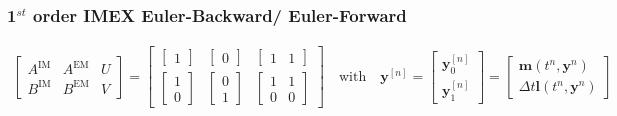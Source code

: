 \subsubsection{1$^{st}$ order IMEX Euler-Backward/ Euler-Forward}
\begin{align*}
\left[ \begin{array}{cc|c}
A^{\mathrm{IM}} & A^{\mathrm{EM}} & U \\
\hline
B^{\mathrm{IM}} & B^{\mathrm{EM}} & V
\end{array} \right ] =
\left[\begin{array}{cc|c}
\left [ \begin{array}{c} 1 \end{array} \right ] & \left [ \begin{array}{c} 0 \end{array} \right ] &
\left [ \begin{array}{cc} 1 & 1 \end{array} \right ] \\
\hline
\left [ \begin{array}{c} 1 \\ 0 \end{array} \right ] & \left [ \begin{array}{c} 0 \\ 1 \end{array} \right ]&
\left [ \begin{array}{cc} 1 & 1 \\ 0 & 0 \end{array} \right ]
\end{array}\right] \quad \mathrm{with}\quad
\boldsymbol{y}^{[n]}=
\left[\begin{array}{c}
\boldsymbol{y}^{[n]}_0\\
\boldsymbol{y}^{[n]}_1
\end{array}\right]=
\left[\begin{array}{c}
\boldsymbol{m}\left(t^n,\boldsymbol{y}^{n}\right)\\
\Delta t \boldsymbol{l}\left ( t^n, \boldsymbol{y}^{n}\right)
\end{array}\right]
\end{align*}

